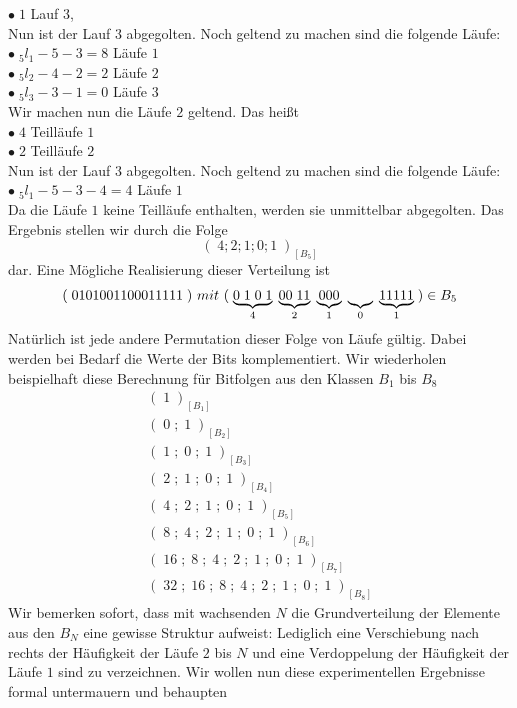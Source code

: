 \documentclass[11pt,oneside,a4paper]{scrreprt}
\begin{document}
\indent $\bullet\; 1$ Lauf $3$,\\
Nun ist der Lauf $3$ abgegolten. Noch geltend zu machen sind die folgende Läufe:\\
\indent $\bullet\; _5l_1-5-3=8$ Läufe $1$\\
\indent $\bullet\; _5l_2-4-2=2$ Läufe $2$\\
\indent $\bullet\; _5l_3-3-1=0$ Läufe $3$\\
Wir machen nun die Läufe $2$ geltend. Das heißt\\
\indent $\bullet\; 4$ Teilläufe $1$\\
\indent $\bullet\; 2$ Teilläufe $2$\\
Nun ist der Lauf $3$ abgegolten. Noch geltend zu machen sind die folgende Läufe:\\
\indent $\bullet\; _5l_1-5-3-4=4$ Läufe $1$\\
Da die Läufe $1$ keine Teilläufe enthalten, werden sie unmittelbar abgegolten. Das Ergebnis stellen wir durch die Folge 
\begin{equation}
(\;4;2;1;0;1\;)_{[B_5]}
\end{equation}
dar. Eine Mögliche Realisierung dieser Verteilung ist
\begin{equation}\label{eqn:FolgeAusB_5}
(\;0101001100011111\;)\ mit\ (\;\underbrace{ 0\; 1\; 0\; 1}_4\; \underbrace{00\; 11}_2\; \underbrace{000}_1\;\underbrace{\;\;\;\;}_0\; \underbrace{11111}_1\; )\in B_5\\
\end{equation}
Natürlich ist jede andere Permutation dieser Folge von Läufe gültig. Dabei werden bei Bedarf die Werte der Bits komplementiert. 
Wir wiederholen beispielhaft diese Berechnung für Bitfolgen aus den Klassen $B_1$ bis $B_8$
\begin{eqnarray}\label{eqnarray:ElementeB_1BisB_8}
(\;1\;)_{[B_1]}\label{eqn:FolgeAusB_1}\\
(\;0\;;\;1\;)_{[B_2]}\\
(\;1\;;\;0\;;\;1\;)_{[B_3]}\\
(\;2\;;\;1\;;\;0\;;\;1\;)_{[B_4]}\\
(\;4\;;\;2\;;\;1\;;\;0\;;\;1\;)_{[B_5]}\\
(\;8\;;\;4\;;\;2\;;\;1\;;\;0\;;\;1\;)_{[B_6]}\\
(\;16\;;\;8\;;\;4\;;\;2\;;\;1\;;\;0\;;\;1\;)_{[B_7]}\\
(\;32\;;\;16\;;\;8\;;\;4\;;\;2\;;\;1\;;\;0\;;\;1\;)_{[B_8]}\label{eqn:FolgeAusB_8}
\end{eqnarray}
Wir bemerken sofort, dass mit wachsenden $N$ die Grundverteilung der Elemente aus den $B_N$ eine gewisse Struktur aufweist: Lediglich eine Verschiebung nach rechts der Häufigkeit der Läufe $2$ bis $N$ und eine Verdoppelung der Häufigkeit der Läufe $1$ sind zu verzeichnen. Wir wollen nun diese experimentellen Ergebnisse formal untermauern und behaupten
\end{document}
